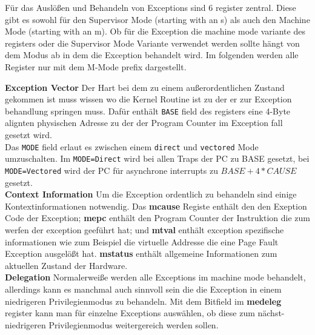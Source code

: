 Für das Auslößen und Behandeln von Exceptions sind 6 register zentral. Diese gibt es sowohl
für den Supervisor Mode (starting with an s) als auch den Machine Mode (starting with an m).
 Ob für die Exception die machine mode variante des
registers oder die Supervisor Mode Variante verwendet werden sollte hängt von dem Modus ab
in dem die Exception behandelt wird. Im folgenden werden alle Register nur mit dem M-Mode 
prefix dargestellt. 


\textbf{Exception Vector} Der Hart  bei dem zu einem
außerordentlichen Zustand gekommen ist muss wissen wo die Kernel Routine ist zu der er zur
Exception behandlung springen muss. Dafür enthält \texttt{BASE} field des registers eine
4-Byte alignten physischen Adresse zu der der Program Counter im Exception fall gesetzt wird.\\
Das \texttt{MODE} field erlaut es zwischen einem \texttt{direct} und \texttt{vectored} Mode
umzuschalten. Im \texttt{MODE=Direct} wird bei allen Traps der PC zu BASE gesetzt, bei
\texttt{MODE=Vectored} wird der PC für asynchrone interrupts zu $ BASE+4*CAUSE $ gesetzt.\\

\textbf{Context Information} Um die Exception ordentlich zu behandeln sind einige
Kontextinformationen notwendig. Das \textbf{mcause} Registe enthält den den Exeption Code
der Exception; \textbf{mepc} enthält den Program Counter der Instruktion die zum werfen der
exception geeführt hat; und \textbf{mtval} enthält exception spezifische informationen wie
zum Beispiel die virtuelle Addresse die eine Page Fault Exception ausgelößt hat.
\textbf{mstatus} enthält allgemeine Informationen zum aktuellen Zustand der Hardware.\\

\textbf{Delegation} Normalerweiße werden alle Exceptions im machine mode behandelt, allerdings
kann es manchmal auch sinnvoll sein die die Exception in einem niedrigeren Privilegienmodus
zu behandeln. Mit dem Bitfield im \textbf{medeleg} register kann man für einzelne Exceptions
auswählen, ob diese zum nächst-niedrigeren Privilegienmodus weitergereich werden sollen.\\

